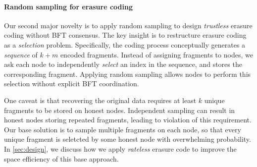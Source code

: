 \paragraph{\textbf{Random sampling for erasure coding}}
Our second major novelty is to apply random sampling to design \emph{trustless} erasure coding without BFT consensus.
The key insight is to restructure erasure coding as a \emph{selection} problem.
Specifically, the coding process conceptually generates a \emph{sequence} of $k + m$ encoded fragments.
Instead of assigning fragments to nodes, we ask each node to independently \emph{select} an index in the sequence, and stores the corresponding fragment.
Applying random sampling allows nodes to perform this selection without explicit BFT coordination.



One caveat is that recovering the original data requires at least $k$ unique fragments to be stored on honest nodes.
Independent sampling can result in honest nodes storing repeated fragments, leading to violation of this requirement.
Our base solution is to sample multiple fragments on each node, so that every unique fragment is seletcted by some honest node with overwhelming probability.
In \autoref{sec:design}, we discuss how we apply \emph{rateless} erasure code to improve the space efficiency of this base approach.
